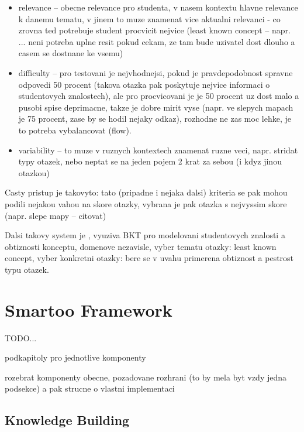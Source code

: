 \documentclass[a4paper, 12pt, twoside]{fithesis2}		%
\renewcommand{\_}{\leavevmode \kern0.0em\vbox{\hrule width0.4em}}
\newcommand{\squarebullet}{\textcolor{black}{\raisebox{0.15em}{\rule{4pt}{4pt}}}}
\newenvironment{myItemize}{
  \begin{itemize}[leftmargin=2em,rightmargin=1em,itemsep=\parskip ,parsep=0em,topsep=0em,partopsep=0em]
  \renewcommand{\labelitemi}{\squarebullet}
  \renewcommand{\labelitemii}{$\diamond$}
}{
  \end{itemize}
}
\begin{document}
\begin{myItemize}
  \item relevance -- obecne relevance pro studenta, v nasem kontextu hlavne relevance k danemu tematu, v jinem to muze znamenat vice aktualni relevanci - co zrovna ted potrebuje student procvicit nejvice (least known concept -- napr. \cite{question-gen-adapt-bayes} ... neni potreba uplne resit pokud cekam, ze tam bude uzivatel dost dlouho a casem se dostnane ke vsemu)
  \item difficulty -- pro testovani je nejvhodnejsi, pokud je pravdepodobnost spravne odpovedi 50 procent (takova otazka pak poskytuje nejvice informaci o studentovych znalostech), ale pro procvicovani je je 50 procent uz dost malo a pusobi spise deprimacne, takze je dobre mirit vyse (napr. ve slepych mapach je 75 procent, zase by se hodil nejaky odkaz), rozhodne ne zas moc lehke, je to potreba vybalancovat (flow).
  \item variability -- to muze v ruznych kontextech znamenat ruzne veci, napr. stridat typy otazek, nebo neptat se na jeden pojem 2 krat za sebou (i kdyz jinou otazkou)
\end{myItemize}

Casty pristup je takovyto: tato (pripadne i nejaka dalsi) kriteria se pak mohou podili nejakou vahou na skore otazky, vybrana je pak otazka s nejvyssim skore (napr. slepe mapy -- citovat)

Dalsi takovy system je
\cite{question-gen-adapt-bayes}, vyuziva BKT pro modelovani studentovych znalosti a obtiznosti konceptu,  domenove nezavisle, vyber tematu otazky: least known concept, vyber konkretni otazky: bere se v uvahu primerena obtiznost a pestrost typu otazek.




\chapter{Smartoo Framework}
\label{chap:smartoo}

TODO...

podkapitoly pro jednotlive komponenty

rozebrat komponenty obecne, pozadovane rozhrani (to by mela byt vzdy jedna podsekce) a pak strucne o vlastni implementaci

\section{Knowledge Building}
\label{sec:smartoo-knowledge}
\end{document}
